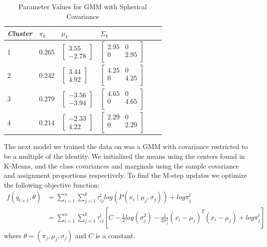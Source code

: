 \documentclass[paper=a4, fontsize=11pt]{scrartcl} %
\numberwithin{equation}{section} %
\numberwithin{figure}{section} %
\numberwithin{table}{section} %
\begin{document}
	\begin{table}
		\caption {Parameter Values for GMM with Spherical Covariance} \label{tab:title} 
		\begin{center}		
			\begin{tabular}{*6l}   
				\toprule
				\emph{Cluster}&  $\pi_k$ & $\mu_k$ & $\Sigma_k$\\\midrule
				1 & 0.265 
				& $\begin{bmatrix}3.55 \\ -2.78\end{bmatrix}$  
				& $\begin{bmatrix}
				2.95 & 0 \\
				0 & 2.95 \\ \end{bmatrix}$\\
				2 & 0.242 
				& $\begin{bmatrix}3.44 \\ 4.92\end{bmatrix}$ 
				& $\begin{bmatrix}
				4.25 & 0 \\
				0 & 4.25 \\ \end{bmatrix}$\\
				3 & 0.279
				& $\begin{bmatrix}-3.56 \\ -3.94\end{bmatrix}$ 
				& $\begin{bmatrix}
				4.65 & 0 \\
				0 &  4.65 \\ \end{bmatrix}$\\	
				4 & 0.214
				& $\begin{bmatrix}-2.33 \\4.22 \end{bmatrix}$ 
				& $\begin{bmatrix}
				2.29 & 0 \\
				0 &  2.29 \\ \end{bmatrix}$	
				\\\bottomrule
				\hline
			\end{tabular}
		\end{center}
	\end{table}

The next model we trained the data on was a GMM with covariance restricted to be a multiple of the identity. We initialized the means using the centers found in K-Means, and the class covariances and marginals using the sample covariance and assignment proportions respectively. To find the M-step updates we optimize the following objective function:
\begin{align*}
f(q_{t+1},\theta) &= \sum_{i=1}^{n}\sum_{j=1}^{k}\tau_{ij}^{t}log(P(x_i \mid \mu_j, \sigma_j)) + log\pi_j^t\\
&=  \sum_{i=1}^{n}\sum_{j=1}^{k}\tau_{ij}^{t}\left[ C-\frac{1}{2}log(\sigma_j^2)-\frac{1}{2\sigma_j^2}(x_i-\mu_j)^T(x_i-\mu_j) + log\pi_j^t\right]
\end{align*}
where \(\theta=(\pi_j, \mu_j, \sigma_j)\) and \(C\) is a constant.
\end{document}
